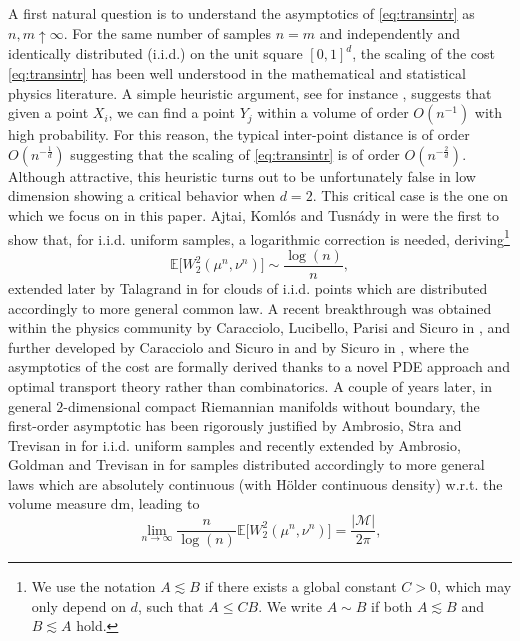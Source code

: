 \documentclass[11pt,a4paper,oneside]{amsart}
\numberwithin{equation}{section}
\newcommand{\dd}{\mathrm{d}}
\begin{document}
%
\medskip
%

A first natural question is to understand the asymptotics of \eqref{eq:transintr} as $n,m\uparrow\infty$. For the same number of samples $n=m$ and independently and identically distributed (i.i.d.) on the unit square $[0,1]^d$, the scaling of the cost \eqref{eq:transintr} has been well understood in the mathematical and statistical physics literature. A simple heuristic argument, see for instance \cite{MezPar}, suggests that given a point $X_i$, we can find a point $Y_j$ within a volume of order  $O(n^{-1})$ with high probability. For this reason, the typical inter-point distance is of order  $O(n^{-\frac1d})$ suggesting that the scaling of \eqref{eq:transintr} is of order  $O(n^{-\frac2d})$. Although attractive, this heuristic turns out to be unfortunately false in low dimension showing a critical behavior when $d=2$. This critical case is the one on which we focus on in this paper. Ajtai, Koml\'os and Tusn\'ady in \cite{AKT84} were the first to show that, for i.i.d. uniform samples, a logarithmic correction is needed, deriving\footnote{We use the notation $A \lesssim B$ if there exists a global constant $C>0$, which may only depend on $d$, such that $A\le CB$. We write $A\sim B$ if both $A \lesssim B$ and $B \lesssim A$ hold.}
%
\begin{equation}\label{eq:unifmatchingrates}
%
\mathbb{E}\big[W_2^2 (\mu^n, \nu^n)\big]\sim \frac{\log(n)}{n},
%
\end{equation}
%
extended later by Talagrand in \cite{talagrand1992ajtai} for clouds of i.i.d. points which are distributed accordingly to more general common law. A recent breakthrough was obtained within the physics community by Caracciolo, Lucibello, Parisi and Sicuro in \cite{caracciolo2014scaling}, and further developed by Caracciolo and Sicuro in \cite{caracciolo2015scaling} and by Sicuro in \cite{sicuro2017euclidean}, where the asymptotics of the cost are formally derived thanks to a novel PDE approach and optimal transport theory rather than combinatorics. A couple of years later, in general $2$-dimensional compact Riemannian manifolds without boundary, the first-order asymptotic has been rigorously justified by Ambrosio, Stra and Trevisan in \cite{ambrosio2019pde} for i.i.d. uniform samples and recently extended by Ambrosio, Goldman and Trevisan in \cite{ambrosio2021quadratic} for samples distributed accordingly to more general laws which are absolutely continuous (with H\"older continuous density) w.r.t. the volume measure $\dd \mathrm{m}$, leading to 
%
\begin{equation}\label{eq:AsymptoticCost}
%
\lim_{n\rightarrow\infty} \frac{n}{\log(n)} \mathbb{E}\big[W_2^2 (\mu^n,\nu^n)\big] = \frac{\vert\mathcal{M}\vert}{2\pi},
%
\end{equation}
\end{document}
